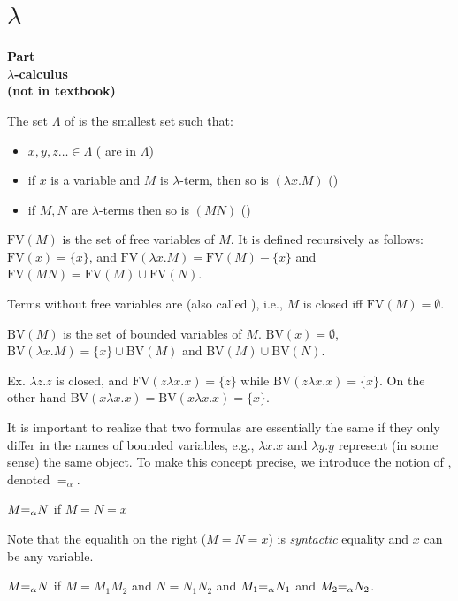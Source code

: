 
\newcommand{\mytitle}{Computational Foundations \\ Appendix}
\newcommand{\mychpnr}{9}

\section{$\lambda$}

\begin{frame}
\begin{center}
\addtocounter{part}{1}
{\bf Part  \\ $\lambda$-calculus \\ (not in textbook)} 
\end{center}
\end{frame}

\begin{frame}

The set $\Lambda$ of  is the smallest set such
that:
\begin{itemize}
\item $x,y,z\ldots\in\Lambda$ ( are in $\Lambda$)
\item if $x$ is a variable and $M$ is $\lambda$-term, then so is
$(\lambda x.M)$ ()
\item if $M,N$ are $\lambda$-terms then so is $(MN)$
()
\end{itemize}

$\text{FV}(M)$ is the set of free variables of $M$.  It is defined
recursively as follows: $\text{FV}(x)=\{x\}$, and $\text{FV}(\lambda
x.M)=\text{FV}(M)-\{x\}$ and
$\text{FV}(MN)=\text{FV}(M)\cup\text{FV}(N)$.

Terms without free variables are  (also called
), i.e., $M$ is closed iff $\text{FV}(M)=\emptyset$.

$\text{BV}(M)$ is the set of bounded variables of $M$.
$\text{BV}(x)=\emptyset$, $\text{BV}(\lambda
x.M)=\{x\}\cup\text{BV}(M)$ and $\text{BV}(M)\cup\text{BV}(N)$.
\end{frame}

\begin{frame}
Ex. $\lambda z.z$ is closed, and $\text{FV}(z\lambda x.x)=\{z\}$ while
$\text{BV}(z\lambda x.x)=\{x\}$.  On the other hand
$\text{BV}(x\lambda x.x)=\text{BV}(x\lambda x.x)=\{x\}$.

It is important to realize that two formulas are essentially the same
if they only differ in the names of bounded variables, e.g., $\lambda
x.x$ and $\lambda y.y$ represent (in some sense) the same object.  To
make this concept precise, we introduce the notion of
, denoted $=_\alpha$.

$M{=_\alpha} N$ if $M=N=x$

Note that the equalith on the right ($M=N=x$) is {\em syntactic}
equality and $x$ can be any variable.

$M{=_\alpha} N$ if $M=M_1M_2$ and $N=N_1N_2$ and $M_1{=_\alpha} N_1$ and $M_2{=_\alpha}
N_2$.
\end{frame}

